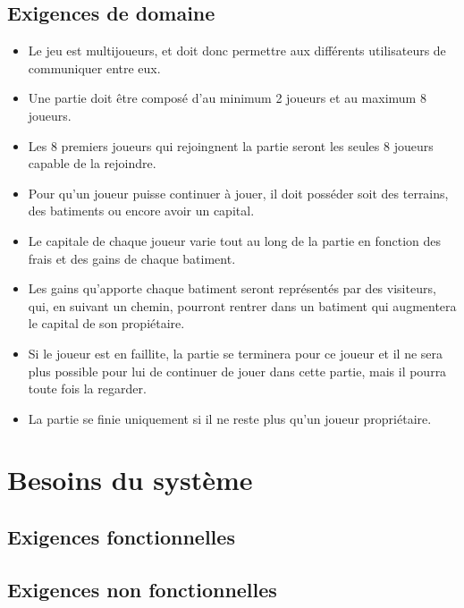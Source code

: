 \documentclass[a4paper,11pt]{report}
\begin{document}
\newpage

\section{Exigences de domaine}
\begin{itemize}
 \item Le jeu est multijoueurs, et doit donc permettre aux différents utilisateurs de communiquer entre eux.
 \item Une partie doit être composé d'au minimum 2 joueurs et au maximum 8 joueurs.
 \item Les 8 premiers joueurs qui rejoingnent la partie seront les seules 8 joueurs capable de la rejoindre.
 \item Pour qu'un joueur puisse continuer à jouer, il doit posséder soit des terrains, des batiments ou encore avoir
 un capital. 
 \item Le capitale de chaque joueur varie tout au long de la partie en fonction des frais et des gains de chaque batiment.
 \item Les gains qu'apporte chaque batiment seront représentés par des visiteurs, qui, en suivant un chemin, pourront 
 rentrer dans un batiment qui augmentera le capital de son propiétaire.
 \item Si le joueur est en faillite, la partie se terminera pour ce joueur et il ne sera plus possible pour lui de
 continuer de jouer dans cette partie, mais il pourra toute fois la regarder.
 \item La partie se finie uniquement si il ne reste plus qu'un joueur propriétaire.

 \end{itemize}

\newpage
\chapter{Besoins du système}
\section{Exigences fonctionnelles}
\section{Exigences non fonctionnelles}
\end{document}

